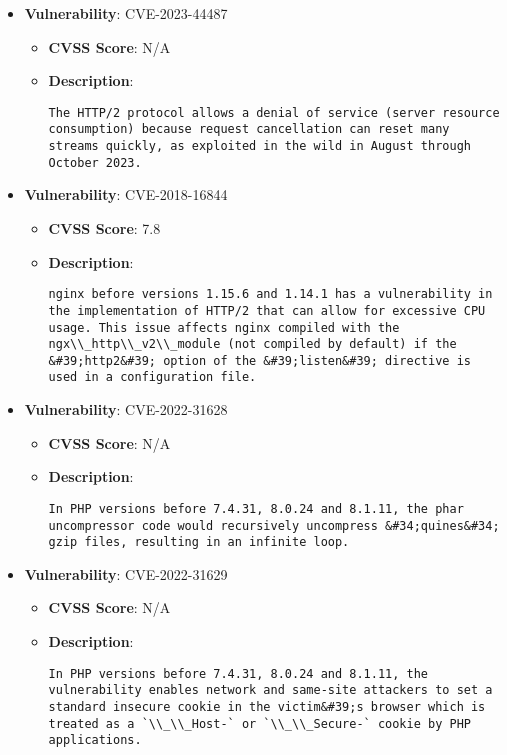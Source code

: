 \documentclass{article}
\begin{document}
\begin{itemize}
    
        \item \textbf{Vulnerability}: CVE-2023-44487
        \begin{itemize}
            \item \textbf{CVSS Score}:  N/A 
            \item \textbf{Description}:
            \parbox[t]{0.9\linewidth}{
                \verb|The HTTP/2 protocol allows a denial of service (server resource consumption) because request cancellation can reset many streams quickly, as exploited in the wild in August through October 2023.|
            }
        \end{itemize}
    
        \item \textbf{Vulnerability}: CVE-2018-16844
        \begin{itemize}
            \item \textbf{CVSS Score}:  7.8 
            \item \textbf{Description}:
            \parbox[t]{0.9\linewidth}{
                \verb|nginx before versions 1.15.6 and 1.14.1 has a vulnerability in the implementation of HTTP/2 that can allow for excessive CPU usage. This issue affects nginx compiled with the ngx\\_http\\_v2\\_module (not compiled by default) if the &#39;http2&#39; option of the &#39;listen&#39; directive is used in a configuration file.|
            }
        \end{itemize}
    
        \item \textbf{Vulnerability}: CVE-2022-31628
        \begin{itemize}
            \item \textbf{CVSS Score}:  N/A 
            \item \textbf{Description}:
            \parbox[t]{0.9\linewidth}{
                \verb|In PHP versions before 7.4.31, 8.0.24 and 8.1.11, the phar uncompressor code would recursively uncompress &#34;quines&#34; gzip files, resulting in an infinite loop.|
            }
        \end{itemize}
    
        \item \textbf{Vulnerability}: CVE-2022-31629
        \begin{itemize}
            \item \textbf{CVSS Score}:  N/A 
            \item \textbf{Description}:
            \parbox[t]{0.9\linewidth}{
                \verb|In PHP versions before 7.4.31, 8.0.24 and 8.1.11, the vulnerability enables network and same-site attackers to set a standard insecure cookie in the victim&#39;s browser which is treated as a `\\_\\_Host-` or `\\_\\_Secure-` cookie by PHP applications.|
            }
        \end{itemize}
    

\end{itemize}
\end{document}
